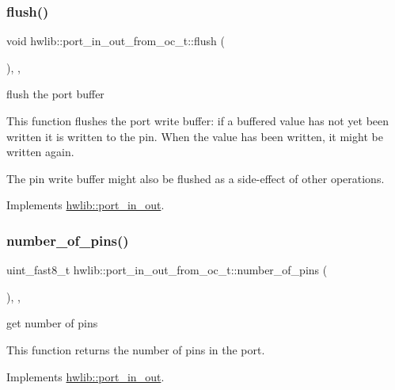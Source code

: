 \subsubsection{\texorpdfstring{flush()}{flush()}}
{\footnotesize\ttfamily void hwlib\+::port\+\_\+in\+\_\+out\+\_\+from\+\_\+oc\+\_\+t\+::flush (\begin{DoxyParamCaption}{ }\end{DoxyParamCaption})\hspace{0.3cm}{\ttfamily [inline]}, {\ttfamily [override]}, {\ttfamily [virtual]}}

flush the port buffer

This function flushes the port write buffer\+: if a buffered value has not yet been written it is written to the pin. When the value has been written, it might be written again.

The pin write buffer might also be flushed as a side-\/effect of other operations. 

Implements \hyperlink{classhwlib_1_1port__in__out_a164564bcd08c137f0ff2e6445e9cfe5e}{hwlib\+::port\+\_\+in\+\_\+out}.

\mbox{\label{classhwlib_1_1port__in__out__from__oc__t_a0dda97b4a90f2f63ed7c95f5b45f4d37}} 
\subsubsection{\texorpdfstring{number\+\_\+of\+\_\+pins()}{number\_of\_pins()}}
{\footnotesize\ttfamily uint\+\_\+fast8\+\_\+t hwlib\+::port\+\_\+in\+\_\+out\+\_\+from\+\_\+oc\+\_\+t\+::number\+\_\+of\+\_\+pins (\begin{DoxyParamCaption}{ }\end{DoxyParamCaption})\hspace{0.3cm}{\ttfamily [inline]}, {\ttfamily [override]}, {\ttfamily [virtual]}}

get number of pins

This function returns the number of pins in the port. 

Implements \hyperlink{classhwlib_1_1port__in__out_a44243a6c7664e734563f1809058751bc}{hwlib\+::port\+\_\+in\+\_\+out}.


